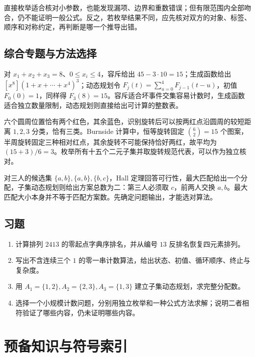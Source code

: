 \documentclass[UTF8,12pt,a4paper,fontset=fandol]{ctexbook}
\begin{document}
直接枚举适合核对小参数，也能发现漏项、边界和重数错误；但有限范围内全部吻合，仍不能证明一般公式。反之，若枚举结果不同，应先核对双方的对象、标签、顺序和对称约定，再判断是哪一个推导出错。

\section{综合专题与方法选择}

对 $x_1+x_2+x_3=8$、$0\le x_i\le4$，容斥给出 $45-3\cdot10=15$；生成函数给出 $[x^8](1+x+\cdots+x^4)^3$；动态规划令 $F_j(t)=\sum_{u=0}^4F_{j-1}(t-u)$，初值 $F_0(0)=1$，同样得 $F_3(8)=15$。容斥适合坏事件交集容易计数时，生成函数适合独立数量限制，动态规划则直接给出可计算的整数表。

六个圆周位置恰有两个红色，其余蓝色，识别旋转后可以按两红点沿圆周的较短距离 $1,2,3$ 分类，恰有三类。Burnside 计算中，恒等旋转固定 $\binom62=15$ 个图案，半周旋转固定三种相对红点，其余旋转不可能保持恰好两红，故平均为 $(15+3)/6=3$。枚举所有十五个二元子集并取旋转规范代表，可以作为独立核对。

对三人的候选集 $\{a,b\},\{a,b\},\{b,c\}$，Hall 定理回答可行性，最大匹配给出一个分配，子集动态规划则给出方案总数为二：第三人必须取 $c$，前两人交换 $a,b$。最大匹配大小本身并不等于匹配方案数。先确定问题输出，才能选对算法。

\section{习题}
\begin{enumerate}
  \item\label{ex:algorithms-1} 计算排列 $2413$ 的零起点字典序排名，并从编号 $13$ 反排名恢复四元素排列。
  \item\label{ex:algorithms-2} 写出不含连续三个 $1$ 的零一串计数算法，给出状态、初值、循环顺序、终止与复杂度。
  \item\label{ex:algorithms-3} 用 $A_1=\{1,2\},A_2=\{2,3\},A_3=\{1,3\}$ 建立子集动态规划，求完整分配数。
  \item\label{ex:algorithms-4} 选择一个小规模计数问题，分别用独立枚举和一种公式方法求解；说明二者相符验证了哪些内容，仍未证明哪些内容。
\end{enumerate}

\appendix

\chapter{预备知识与符号索引}
\label{app:prerequisites}
\end{document}
